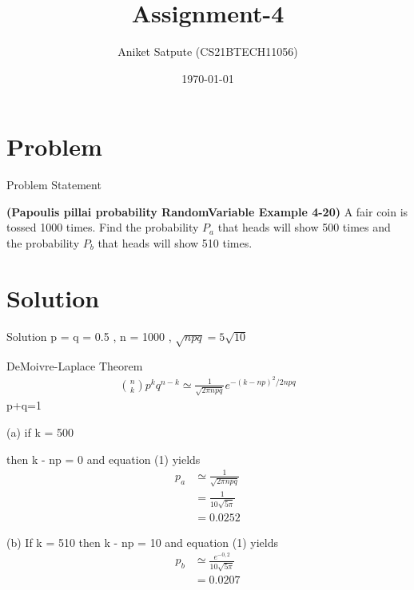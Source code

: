 \documentclass{beamer}
\title{Assignment-4}
\author{Aniket Satpute (CS21BTECH11056)}
\date{\today}
\begin{document}
\begin{frame}
    \titlepage 
\end{frame}

\logo{}



\section{Problem}
\begin{frame}{Problem Statement}

\textbf{(Papoulis pillai probability RandomVariable Example 4-20)} A fair coin is tossed 1000 times. Find the probability $P_a$ that heads will show 500
times and the probability $P_b$ that heads will show 510 times.
\end{frame}

\section{Solution}

\begin{frame}{Solution}
p = q = 0.5 , n = 1000 , $\sqrt{npq} = 5\sqrt{10} $
\begin{exampleblock}{DeMoivre-Laplace Theorem}
\begin{align}
{n\choose k }p^{k} q^{n-k} \simeq \frac{1}{\sqrt{2 \pi n p q }} e^{-(k-np)^{2} / 2npq} 
\end{align}
p+q=1
\end{exampleblock}
\end{frame} 

\begin{frame}

\begin{alertblock}{(a) if k = 500}

then k - np = 0 and equation (1) yields
\begin{align*}
p_{a} & \simeq \frac{1}{\sqrt{2 \pi npq}}\\
&= \frac{1}{10\sqrt{5 \pi}}\\
&= 0.0252
\end{align*}
\end{alertblock}

\end{frame}

\begin{frame}

\begin{alertblock}{(b) If k = 510}
then k - np = 10 and equation (1) yields
\begin{align*}
p_{b} & \simeq \frac{e^{-0,2}}{ 10\sqrt{5 \pi}}\\
&= 0.0207
\end{align*}
\end{alertblock}
    
\end{frame}
\end{document}
